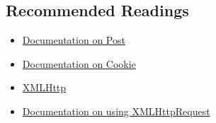 \subsection{Recommended Readings}
\begin{itemize}[noitemsep]
	\item \href{https://developer.mozilla.org/en-US/docs/Web/HTTP/Methods/POST}{Documentation on Post}
	\item \href{https://developer.mozilla.org/en-US/docs/Web/HTTP/Cookies}{Documentation on Cookie}
	\item  \href{https://developer.mozilla.org/en-US/docs/Web/API/XMLHttpRequest}{XMLHttp}
	\item  \href{https://developer.mozilla.org/en-US/docs/Web/API/XMLHttpRequest_API/Using_XMLHttpRequest}{Documentation on using XMLHttpRequest}
\end{itemize}

